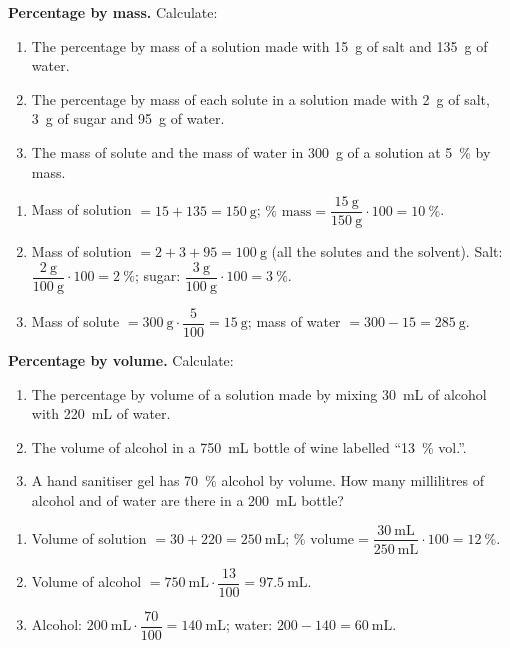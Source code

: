 \begin{exercise}
    \textbf{Percentage by mass.} Calculate:
    \begin{enumerate}[label=\letraminuscula]
        \item The percentage by mass of a solution made with \qty{15}{\g} of salt and \qty{135}{\g} of water.
        \item The percentage by mass of each solute in a solution made with \qty{2}{\g} of salt, \qty{3}{\g} of sugar and \qty{95}{\g} of water.
        \item The mass of solute and the mass of water in \qty{300}{\g} of a solution at \qty{5}{\percent} by mass.
    \end{enumerate}
    \begin{solu}
        \begin{enumerate}[label=\alph*)]
            \item Mass of solution \(= 15 + 135 = \qty{150}{\g}\); \(\%\text{ mass} = \dfrac{\qty{15}{\g}}{\qty{150}{\g}} \cdot 100 = \qty{10}{\percent}\).
            \item Mass of solution \(= 2 + 3 + 95 = \qty{100}{\g}\) (all the solutes and the solvent). Salt: \(\dfrac{\qty{2}{\g}}{\qty{100}{\g}} \cdot 100 = \qty{2}{\percent}\); sugar: \(\dfrac{\qty{3}{\g}}{\qty{100}{\g}} \cdot 100 = \qty{3}{\percent}\).
            \item Mass of solute \(= \qty{300}{\g} \cdot \dfrac{5}{100} = \qty{15}{\g}\); mass of water \(= 300 - 15 = \qty{285}{\g}\).
        \end{enumerate}
    \end{solu}
\end{exercise}

\begin{exercise}
    \textbf{Percentage by volume.} Calculate:
    \begin{enumerate}[label=\letraminuscula]
        \item The percentage by volume of a solution made by mixing \qty{30}{\mL} of alcohol with \qty{220}{\mL} of water.
        \item The volume of alcohol in a \qty{750}{\mL} bottle of wine labelled ``\qty{13}{\percent} vol.''.
        \item A hand sanitiser gel has \qty{70}{\percent} alcohol by volume. How many millilitres of alcohol and of water are there in a \qty{200}{\mL} bottle?
    \end{enumerate}
    \begin{solu}
        \begin{enumerate}[label=\alph*)]
            \item Volume of solution \(= 30 + 220 = \qty{250}{\mL}\); \(\%\text{ volume} = \dfrac{\qty{30}{\mL}}{\qty{250}{\mL}} \cdot 100 = \qty{12}{\percent}\).
            \item Volume of alcohol \(= \qty{750}{\mL} \cdot \dfrac{13}{100} = \qty{97.5}{\mL}\).
            \item Alcohol: \(\qty{200}{\mL} \cdot \dfrac{70}{100} = \qty{140}{\mL}\); water: \(200 - 140 = \qty{60}{\mL}\).
        \end{enumerate}
    \end{solu}
\end{exercise}

